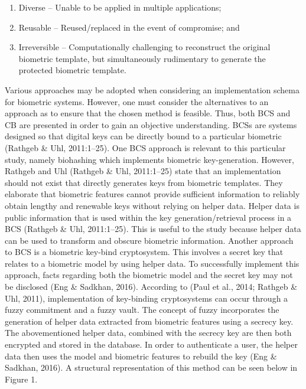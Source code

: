 \begin{enumerate}[label=\roman*.]
	\item Diverse – Unable to be applied in multiple applications;
	\item Reusable – Reused/replaced in the event of compromise; and
	\item Irreversible – Computationally challenging to reconstruct the original biometric template, but simultaneously rudimentary to generate the protected biometric template.
\end{enumerate}

Various approaches may be adopted when considering an implementation schema for biometric systems. However, one must consider the alternatives to an approach as to ensure that the chosen method is feasible. Thus, both BCS and CB are presented in order to gain an objective understanding. 
BCSs are systems designed so that digital keys can be directly bound to a particular biometric (Rathgeb \& Uhl, 2011:1–25). One BCS approach is relevant to this particular study, namely biohashing which implements biometric key-generation. However, Rathgeb and Uhl (Rathgeb \& Uhl, 2011:1–25) state that an implementation should not exist that directly generates keys from biometric templates. They elaborate that biometric features cannot provide sufficient information to reliably obtain lengthy and renewable keys without relying on helper data. Helper data is public information that is used within the key generation/retrieval process in a BCS (Rathgeb \& Uhl, 2011:1–25).  This is useful to the study because helper data can be used to transform and obscure biometric information. Another approach to BCS is a biometric key-bind cryptosystem. This involves a secret key that relates to a biometric model by using helper data. To successfully implement this approach, facts regarding both the biometric model and the secret key may not be disclosed (Eng \& Sadkhan, 2016). According to (Paul et al., 2014; Rathgeb \& Uhl, 2011), implementation of key-binding cryptosystems can occur through a fuzzy commitment and a fuzzy vault. The concept of fuzzy incorporates the generation of helper data extracted from biometric features using a secrecy key. The abovementioned helper data, combined with the secrecy key are then both encrypted and stored in the database. In order to authenticate a user, the helper data then uses the model and biometric features to rebuild the key (Eng \& Sadkhan, 2016). A structural representation of this method can be seen below in Figure 1.

